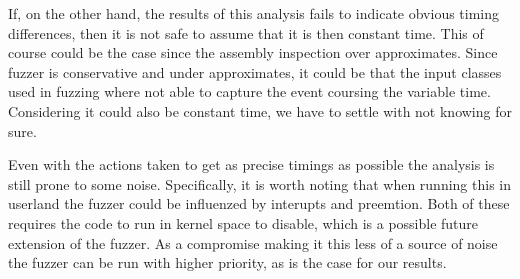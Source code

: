 If, on the other hand, the results of this analysis fails to indicate obvious timing differences, then it is not safe to assume that it is then constant time. This of course could be the case since the assembly inspection over approximates. Since fuzzer is conservative and under approximates, it could be that the input classes used in fuzzing where not able to capture the event coursing the variable time. Considering it could also be constant time, we have to settle with not knowing for sure.

Even with the actions taken to get as precise timings as possible the analysis is still prone to some noise. Specifically, it is worth noting that when running this in userland the fuzzer could be influenzed by interupts and preemtion. Both of these requires the code to run in kernel space to disable, which is a possible future extension of the fuzzer. As a compromise making it this less of a source of noise the fuzzer can be run with higher priority, as is the case for our results. 

